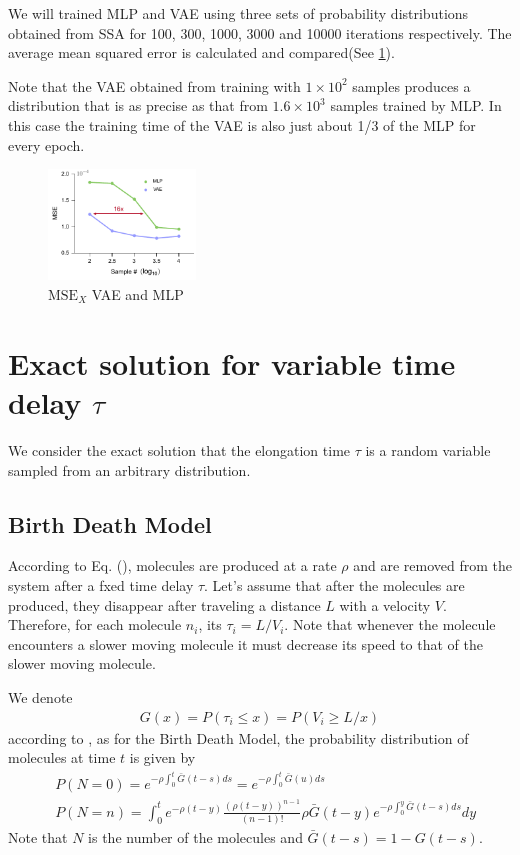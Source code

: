 \documentclass[a4paper,10pt]{article}
\begin{document}
We will trained MLP and VAE using three sets of probability distributions obtained from SSA for 100, 300, 1000, 3000 and 10000 iterations respectively. The average mean squared error is calculated and compared(See \ref{MSE_VAE_MLP}).

Note that the VAE obtained from training with $1 \times 10^2$ samples produces a distribution that is as precise as that from $1.6 \times 10^3$ samples trained by MLP. In this case the training time of the VAE is also just about 1/3 of the MLP for every epoch.
\begin{figure}[h]
	\centering
	\includegraphics[width=0.35\textwidth]{Figs/MSE_VAE_MLP.pdf}
	\caption{$\text{MSE}_X$ VAE and MLP}\label{MSE_VAE_MLP}  
\end{figure}
\section{Exact solution for variable time delay $\tau$}
We consider the exact solution that the elongation time $\tau$ is a random variable sampled from an arbitrary distribution.
\subsection{Birth Death Model}
According to Eq. (), molecules are produced at a rate $\rho$ and are removed from the system after a fxed time delay $\tau$. Let's assume that after the molecules are produced, they disappear after traveling a distance $L$ with a velocity $V$. Therefore, for each molecule $n_i$, its $\tau_i=L/V_i$. Note that whenever the molecule encounters a slower moving molecule it must decrease its speed to that of the slower moving molecule.

We denote
\begin{equation}
	\begin{aligned}
		G(x)=P(\tau_i\leq x)=P(V_i\geq L/x)
	\end{aligned}
\end{equation}
according to \cite{ross2014introduction}, as for the Birth Death Model, the probability distribution of molecules at time $t$ is given by
\begin{equation}
	\begin{aligned}\label{variable tau}
		&P(N=0)=e^{-\rho\int^t_0\bar{G}(t-s)ds}=e^{-\rho\int^t_0\bar{G}(u)ds} \\
		&P(N=n)=\int_0^t e^{-\rho(t-y)} \frac{(\rho(t-y))^{n-1}}{(n-1) !} \rho\bar{G}(t-y) e^{-\rho \int_0^y \bar{G}(t-s) d s} dy
	\end{aligned}
\end{equation}
Note that $N$ is the number of the molecules and $\bar{G}(t-s)=1-G(t-s)$.
\end{document}
